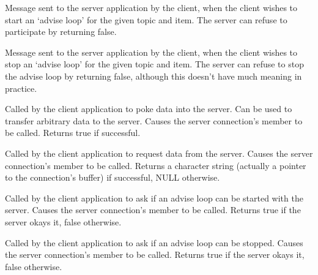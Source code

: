 Message sent to the server application by the client, when the client
wishes to start an `advise loop' for the given topic and item. The
server can refuse to participate by returning false.

\label{wxtcpconnectiononstopadvise}


Message sent to the server application by the client, when the client
wishes to stop an `advise loop' for the given topic and item. The
server can refuse to stop the advise loop by returning false, although
this doesn't have much meaning in practice.

\label{wxtcpconnectionpoke}


Called by the client application to poke data into the server. Can be
used to transfer arbitrary data to the server. Causes the server
connection's  member
to be called. Returns true if successful.

\label{wxtcpconnectionrequest}


Called by the client application to request data from the server. Causes
the server connection's  member to be called. Returns a
character string (actually a pointer to the connection's buffer) if
successful, NULL otherwise.

\label{wxtcpconnectionstartadvise}


Called by the client application to ask if an advise loop can be started
with the server. Causes the server connection's \rtfsp
member to be called. Returns true if the server okays it, false
otherwise.

\label{wxtcpconnectionstopadvise}


Called by the client application to ask if an advise loop can be
stopped. Causes the server connection's  member
to be called. Returns true if the server okays it, false otherwise.

